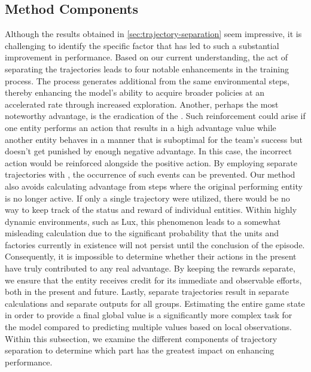 \subsection{Method Components}
\label{subsec:methodcomp}

\noindent Although the results obtained in \autoref{sec:trajectory-separation} seem impressive, it is challenging to identify the specific factor that has led to such a substantial improvement in performance. Based on our current understanding, the act of separating the trajectories leads to four notable enhancements in the training process. The process generates additional  from the same environmental steps, thereby enhancing the model's ability to acquire broader policies at an accelerated rate through increased exploration. Another, perhaps the most noteworthy advantage, is the eradication of the . Such reinforcement could arise if one entity performs an action that results in a high advantage value while another entity behaves in a manner that is suboptimal for the team's success but doesn't get punished by enough negative advantage. In this case, the incorrect action would be reinforced alongside the positive action. By employing separate trajectories with , the occurrence of such events can be prevented. Our method also avoids calculating advantage from steps where the original performing entity is no longer active. If only a single trajectory were utilized, there would be no way to keep track of the status and reward of individual entities. Within highly dynamic environments, such as Lux, this phenomenon leads to a somewhat misleading calculation due to the significant probability that the units and factories currently in existence will not persist until the conclusion of the episode. Consequently, it is impossible to determine whether their actions in the present have truly contributed to any real advantage. By keeping the rewards separate, we ensure that the entity receives credit for its immediate and observable efforts, both in the present and future. Lastly, separate trajectories result in separate  calculations and separate  outputs for all groups. Estimating the entire game state in order to provide a final global value is a significantly more complex task for the model compared to predicting multiple values based on local observations. Within this subsection, we examine the different components of trajectory separation to determine which part has the greatest impact on enhancing performance.

